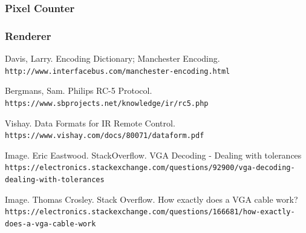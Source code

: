 \documentclass[]{article}
\begin{document}
\subsubsection{Pixel Counter}

\subsubsection{Renderer}


\begin{thebibliography}{99}
    Davis, Larry. Encoding Dictionary; Manchester Encoding.
    \\\texttt{http://www.interfacebus.com/manchester-encoding.html}

    Bergmans, Sam. Philips RC-5 Protocol.
    \\\texttt{https://www.sbprojects.net/knowledge/ir/rc5.php}

    Vishay. Data Formats for IR Remote Control. 
    \\\texttt{https://www.vishay.com/docs/80071/dataform.pdf}
    
    Image. Eric Eastwood. StackOverflow.  VGA Decoding - Dealing with tolerances
    \\\texttt{https://electronics.stackexchange.com/questions/92900/vga-decoding-dealing-with-tolerances}
    
    Image. Thomas Crosley. Stack Overflow.  How exactly does a VGA cable work?
    \\\texttt{https://electronics.stackexchange.com/questions/166681/how-exactly-does-a-vga-cable-work}
\end{thebibliography}
\end{document}
